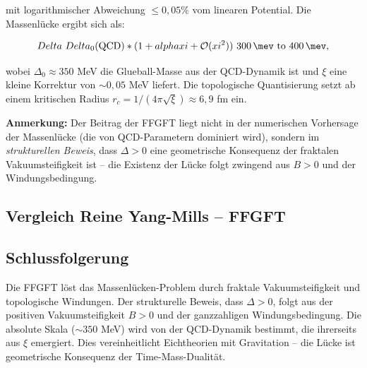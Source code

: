 	mit logarithmischer Abweichung \(\leq 0{,}05\%\) vom linearen Potential. Die Massenlücke ergibt sich als:
	
	\begin{equation}
		\Delta \approx \Delta_0(\text{QCD}) \cdot (1 + \alpha \xi + \mathcal{O}(\xi^2)) \approx \SIrange{300}{400}{\mev},
	\end{equation}
	
	wobei \(\Delta_0 \approx 350\) MeV die Glueball-Masse aus der QCD-Dynamik ist und \(\xi\) eine kleine Korrektur von \(\sim 0{,}05\) MeV liefert. Die topologische Quantisierung setzt ab einem kritischen Radius \(r_c = 1/(4\pi\sqrt{\xi}) \approx 6{,}9\) fm ein.
	
	\textbf{Anmerkung:} Der Beitrag der FFGFT liegt nicht in der numerischen Vorhersage der Massenlücke (die von QCD-Parametern dominiert wird), sondern im \textit{strukturellen Beweis}, dass \(\Delta > 0\) eine geometrische Konsequenz der fraktalen Vakuumsteifigkeit ist -- die Existenz der Lücke folgt zwingend aus \(B > 0\) und der Windungsbedingung.
	
	\subsection*{Vergleich Reine Yang-Mills -- FFGFT}
	
	\begin{center}
		\small
	\end{center}
	
	\subsection*{Schlussfolgerung}
	
	Die FFGFT löst das Massenlücken-Problem durch fraktale Vakuumsteifigkeit und topologische Windungen. Der strukturelle Beweis, dass \(\Delta > 0\), folgt aus der positiven Vakuumsteifigkeit \(B > 0\) und der ganzzahligen Windungsbedingung. Die absolute Skala (\(\sim 350\) MeV) wird von der QCD-Dynamik bestimmt, die ihrerseits aus \(\xi\) emergiert. Dies vereinheitlicht Eichtheorien mit Gravitation -- die Lücke ist geometrische Konsequenz der Time-Mass-Dualität.



